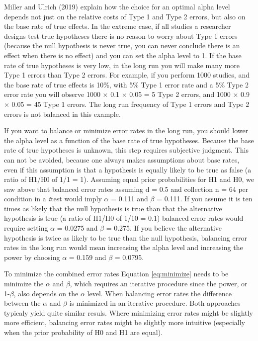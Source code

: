\documentclass[,jou,floatsintext]{apa6}
\begin{document}
Miller and Ulrich (2019) explain how the choice for an optimal alpha level depends not just on the relative costs of Type 1 and Type 2 errors, but also on the base rate of true effects. In the extreme case, if all studies a researcher designs test true hypotheses there is no reason to worry about Type 1 errors (because the null hypothesis is never true, you can never conclude there is an effect when there is no effect) and you can set the alpha level to 1. If the base rate of true hypotheses is very low, in the long run you will make many more Type 1 errors than Type 2 errors. For example, if you perform 1000 studies, and the base rate of true effects is 10\%, with 5\% Type 1 error rate and a 5\% Type 2 error rate you will observe 1000 × 0.1 × 0.05 = 5 Type 2 errors, and 1000 × 0.9 × 0.05 = 45 Type 1 errors. The long run frequency of Type 1 errors and Type 2 errors is not balanced in this example.

If you want to balance or minimize error rates in the long run, you should lower the alpha level as a function of the base rate of true hypotheses. Because the base rate of true hypotheses is unknown, this step requires subjective judgment. This can not be avoided, because one always makes assumptions about base rates, even if this assumption is that a hypothesis is equally likely to be true as false (a ratio of H1/H0 of 1/1 = 1). Assuming equal prior probabilities for H1 and H0, we saw above that balanced error rates assuming d = 0.5 and collection n = 64 per condition in a \emph{t}test would imply \(\alpha\) = 0.111 and \(\beta\) = 0.111. If you assume it is ten times as likely that the null hypothesis is true than that the alternative hypothesis is true (a ratio of H1/H0 of 1/10 = 0.1) balanced error rates would require setting \(\alpha\) = 0.0275 and \(\beta\) = 0.275. If you believe the alternative hypothesis is twice as likely to be true than the null hypothesis, balancing error rates in the long run would mean increasing the alpha level and increasing the power by choosing \(\alpha\) = 0.159 and \(\beta\) = 0.0795.

To minimize the combined error rates Equation \eqref{eq:minimize} needs to be minimize the \(\alpha\) and \(\beta\), which requires an iterative procedure since the power, or 1-\(\beta\), also depends on the \(\alpha\) level. When balancing error rates the difference between the \(\alpha\) and \(\beta\) is minimized in an iterative procedure. Both approaches typicaly yield quite similar resuls. Where minimizing error rates might be slightly more efficient, balancing error rates might be slightly more intuitive (especially when the prior probability of H0 and H1 are equal).
\end{document}
